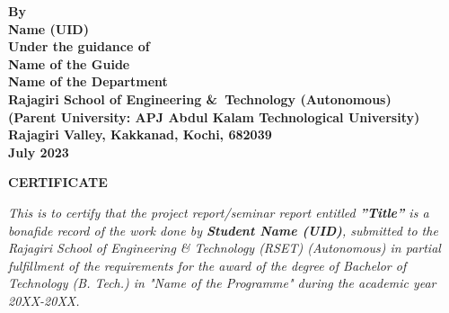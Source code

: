 \begin{center}
	\large \bfseries{By}\\[.2cm]
	\large \bfseries{ Name (UID) }\\[0.6cm]
	\large \bfseries{Under the guidance of}\\[0.5cm]
	\large \bfseries{Name of the Guide}\\[0.75cm]
	\large \textbf{Name of the Department}\\
	\large \textbf{Rajagiri School of Engineering \&\ Technology (Autonomous)}\\
	\small \bfseries{(Parent University: APJ Abdul Kalam Technological University)}\\
	\large \textbf{Rajagiri Valley, Kakkanad, Kochi, 682039}\\
	\large \bfseries{July 2023}
\end{center}

\newpage
\thispagestyle{empty}
\vspace{1cm}
\begin{center}

	\large \bfseries{\huge{CERTIFICATE}}\\[1cm]
\end{center}

\renewcommand{\baselinestretch}{1.2}\normalsize

\emph{This is to certify that the project report/seminar report entitled \textbf{”Title”} is a bonafide record of the work done by \textbf{Student Name (UID)}, submitted to the Rajagiri School of Engineering \& Technology (RSET) (Autonomous) in
	partial fulfillment of the requirements for the award of the degree of Bachelor of Technology (B. Tech.) in "Name of the Programme" during the academic year 20XX-20XX.}\\[2.5cm]

